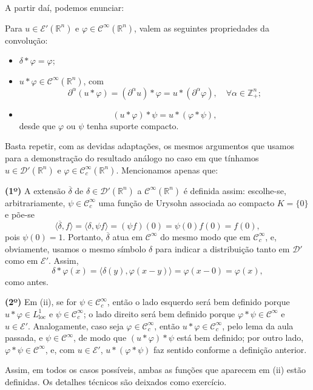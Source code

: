 \documentclass[../distribution_theory_notes.tex]{subfiles}
\begin{document}
A partir daí, podemos enunciar:

\begin{lemma*}
	Para \(u\in \mathcal{E}'(\mathbb{R}^{n})\) e \(\varphi\in \mathcal{C}^{\infty}(\mathbb{R}^{n})\), valem as seguintes propriedades da convolução:
	\begin{itemize}
		\item[(0)] \(\delta*\varphi=\varphi\);
		\item[(i)] \(u*\varphi\in \mathcal{C}^{\infty}(\mathbb{R}^{n})\), com
		      \[
			      \partial^{\alpha}(u*\varphi)
			      =(\partial^{\alpha}u)*\varphi
			      =u*(\partial^{\alpha}\varphi),
			      \quad \forall \alpha\in \mathbb{Z}_{+}^{n};
		      \]
		\item[(ii)]
		      \[
			      (u*\varphi)*\psi=u*(\varphi*\psi),
		      \]
		      desde que \(\varphi\) ou \(\psi\) tenha suporte compacto.
	\end{itemize}
\end{lemma*}
\begin{proof*}
	Basta repetir, com as devidas adaptações, os mesmos argumentos que usamos para a demonstração do resultado análogo no caso em que tínhamos \(u\in \mathcal{D}'(\mathbb{R}^{n})\) e \(\varphi\in \mathcal{C}_{c}^{\infty}(\mathbb{R}^{n})\). Mencionamos apenas que:

	\textbf{(1º)} A extensão \(\overline{\delta }\) de \(\delta\in \mathcal{D}'(\mathbb{R}^{n})\) a \(\mathcal{C}^{\infty}(\mathbb{R}^{n})\) é definida assim: escolhe-se, arbitrariamente, \(\psi\in \mathcal{C}_{c}^{\infty}\) uma função de Urysohn associada ao compacto \(K=\{0\}\) e põe-se
	\[
		\langle \overline{\delta},f\rangle
		=\langle \delta,\psi f\rangle
		=(\psi f)(0)=\psi(0)f(0)=f(0),
	\]
	pois \(\psi(0)=1\). Portanto, \(\overline{\delta}\) atua em \(\mathcal{C}^{\infty}\) do mesmo modo que em \(\mathcal{C}_{c}^{\infty}\), e, obviamente, usamos o mesmo símbolo \(\delta\) para indicar a distribuição tanto em \(\mathcal{D}'\) como em \(\mathcal{E}'\). Assim,
	\[
		\delta*\varphi(x)
		=\langle \delta(y),\varphi(x-y)\rangle
		=\varphi(x-0)=\varphi(x),
	\]
	como antes.

	\textbf{(2º)} Em (ii), se for \(\psi\in \mathcal{C}_{c}^{\infty}\), então o lado esquerdo será bem definido porque \(u*\varphi\in L_{\mathrm{loc}}^{1}\) e \(\psi\in \mathcal{C}_{c}^{\infty}\); o lado direito será bem definido porque \(\varphi*\psi\in \mathcal{C}^{\infty}\) e \(u\in \mathcal{E}'\). Analogamente, caso seja \(\varphi\in \mathcal{C}_{c}^{\infty}\), então \(u*\varphi\in \mathcal{C}_{c}^{\infty}\), pelo lema da aula passada, e \(\psi\in \mathcal{C}^{\infty}\), de modo que \((u*\varphi)*\psi\) está bem definido; por outro lado, \(\varphi*\psi\in \mathcal{C}^{\infty}\), e, com \(u\in \mathcal{E}'\), \(u*(\varphi*\psi)\) faz sentido conforme a definição anterior.

	Assim, em todos os casos possíveis, ambas as funções que aparecem em (ii) estão definidas. Os detalhes técnicos são deixados como exercício. \qedsymbol
\end{proof*}
\end{document}
